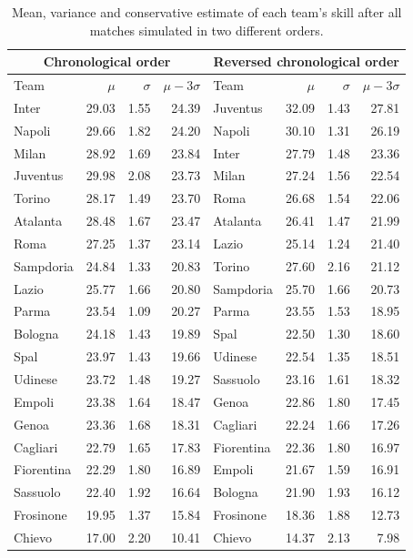 \documentclass{article}
\begin{document}
	
	\begin{table}[t]
		\caption{Mean, variance and conservative estimate of each team's skill after all matches simulated in two different orders.}
		\label{tab:q4}
		\centering
		\begin{tabular}{lrrr|lrrr}
			\toprule
			\multicolumn{4}{c}{Chronological order} & \multicolumn{4}{c}{Reversed chronological order} \\
			\midrule
			Team     		& $ \mu $ & $ \sigma $ & $ \mu - 3\sigma $ & Team & $ \mu $ & $ \sigma $ & $ \mu-3\sigma $\\
			\midrule
		Inter           & 29.03 & 1.55 & 24.39 & Juventus  & 32.09 & 1.43 & 27.81 \\
		Napoli          & 29.66 & 1.82 & 24.20 & Napoli    & 30.10 & 1.31 & 26.19 \\
		Milan           & 28.92 & 1.69 & 23.84 & Inter     & 27.79 & 1.48 & 23.36 \\
		Juventus        & 29.98 & 2.08 & 23.73 & Milan     & 27.24 & 1.56 & 22.54 \\
		Torino          & 28.17 & 1.49 & 23.70 & Roma      & 26.68 & 1.54 & 22.06 \\
		Atalanta        & 28.48 & 1.67 & 23.47 & Atalanta  & 26.41 & 1.47 & 21.99 \\
		Roma            & 27.25 & 1.37 & 23.14 & Lazio     & 25.14 & 1.24 & 21.40 \\
		Sampdoria       & 24.84 & 1.33 & 20.83 & Torino    & 27.60 & 2.16 & 21.12 \\
		Lazio           & 25.77 & 1.66 & 20.80 & Sampdoria & 25.70 & 1.66 & 20.73 \\
		Parma           & 23.54 & 1.09 & 20.27 & Parma     & 23.55 & 1.53 & 18.95 \\
		Bologna         & 24.18 & 1.43 & 19.89 & Spal      & 22.50 & 1.30 & 18.60 \\
		Spal            & 23.97 & 1.43 & 19.66 & Udinese   & 22.54 & 1.35 & 18.51 \\
		Udinese         & 23.72 & 1.48 & 19.27 & Sassuolo  & 23.16 & 1.61 & 18.32 \\
		Empoli          & 23.38 & 1.64 & 18.47 & Genoa     & 22.86 & 1.80 & 17.45 \\
		Genoa           & 23.36 & 1.68 & 18.31 & Cagliari  & 22.24 & 1.66 & 17.26 \\
		Cagliari        & 22.79 & 1.65 & 17.83 & Fiorentina& 22.36 & 1.80 & 16.97 \\
		Fiorentina      & 22.29 & 1.80 & 16.89 & Empoli    & 21.67 & 1.59 & 16.91 \\
		Sassuolo        & 22.40 & 1.92 & 16.64 & Bologna   & 21.90 & 1.93 & 16.12 \\
		Frosinone       & 19.95 & 1.37 & 15.84 & Frosinone & 18.36 & 1.88 & 12.73 \\
		Chievo          & 17.00 & 2.20 & 10.41 & Chievo    & 14.37 & 2.13 &  7.98 \\ \bottomrule
		\end{tabular}
	\end{table}
	
\end{document}

